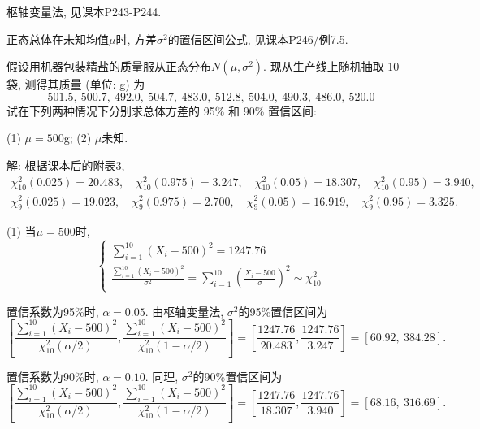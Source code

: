 \documentclass[standard]{ExBook}
\renewenvironment{shaded}{%
  \def\FrameCommand{\fboxsep=\FrameSep \colorbox{shadecolor}}%
  \MakeFramed{\advance\hsize-\width \FrameRestore}%
}{%
  \endMakeFramed
}
\begin{document}
\begin{qitems}
\textcolor{themeColor}{\selectfont {} 枢轴变量法, 见课本P243-P244.}

\textcolor{themeColor}{\selectfont {}
正态总体在未知均值$\mu$时, 方差$\sigma^2$的置信区间公式, 见课本P246/例7.5.}

\vspace{2.5cm-5em}

    \begin{bbox}
    \begin{shaded}
        \qitem
假设用机器包装精盐的质量服从正态分布$N(\mu,\sigma^2)$. 现从生产线上随机抽取 10 袋, 测得其质量 (单位: g) 为
$$501.5,\ 500.7,\ 492.0,\ 504.7,\ 483.0,\ 512.8,\ 504.0,\ 490.3,\ 486.0,\ 520.0$$
试在下列两种情况下分别求总体方差的 95\% 和 90\% 置信区间:

(1) $\mu=500$g; \qquad (2) $\mu$未知.
    \end{shaded}
    \end{bbox}

\vspace{\dimexpr2.5cm-5em\relax}

解: 根据课本后的附表3,
$$
\begin{gathered}
\chi_{10}^2(0.025)=20.483,\quad
\chi_{10}^2(0.975)=3.247,\quad
\chi_{10}^2(0.05)=18.307,\quad
\chi_{10}^2(0.95)=3.940,\\
\chi_9^2(0.025)=19.023,\quad
\chi_9^2(0.975)=2.700,\quad
\chi_9^2(0.05)=16.919,\quad
\chi_9^2(0.95)=3.325.
\end{gathered}
$$

(1) 当$\mu=500$时,
$$
\left\{
\begin{array}{r}
\displaystyle\sum_{i=1}^{10}(X_i-500)^2=1247.76\\
\displaystyle\frac{\sum\limits_{i=1}^{10}(X_i-500)^2}{\sigma^2}
=
\sum_{i=1}^{10}\left(\frac{X_i-500}{\sigma}\right)^2
\sim\chi_{10}^2
\end{array}
\right.
$$

置信系数为95\%时, $\alpha=0.05$. 由枢轴变量法, $\sigma^2$的95\%置信区间为
$$
\left[
\frac{\sum\limits_{i=1}^{10}(X_i-500)^2}{\chi_{10}^2(\alpha/2)},
\frac{\sum\limits_{i=1}^{10}(X_i-500)^2}{\chi_{10}^2(1-\alpha/2)}
\right]
=
\left[
\frac{1247.76}{20.483},
\frac{1247.76}{3.247}
\right]
=
[60.92,\ 384.28].
$$

置信系数为90\%时, $\alpha=0.10$. 同理, $\sigma^2$的90\%置信区间为
$$
\left[
\frac{\sum\limits_{i=1}^{10}(X_i-500)^2}{\chi_{10}^2(\alpha/2)},
\frac{\sum\limits_{i=1}^{10}(X_i-500)^2}{\chi_{10}^2(1-\alpha/2)}
\right]
=
\left[
\frac{1247.76}{18.307},
\frac{1247.76}{3.940}
\right]
=
[68.16,\ 316.69].
$$


\end{qitems}
\end{document}
